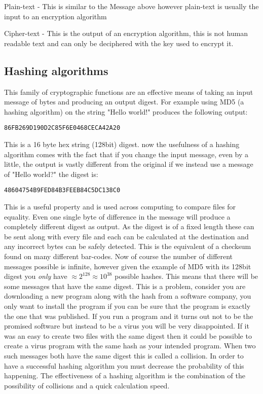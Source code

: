 \documentclass[12pt]{article}
\begin{document}
Plain-text - This is similar to the Message above however plain-text is usually the input to an encryption algorithm

Cipher-text - This is the output of an encryption algorithm, this is not human readable text and 
can only be deciphered with the key used to encrypt it.

\subsection{Hashing algorithms}
This family of cryptographic functions are an effective means of taking
an input message of bytes and producing an output digest. 
For example using MD5 (a hashing algorithm) on the string "Hello world!" produces the following output:

\begin{center}
{\tt 86FB269D190D2C85F6E0468CECA42A20}
\end{center}

This is a 16 byte hex string (128bit) digest. now the usefulness of a hashing algorithm
comes with the fact that if you change the input message, even by a little, the output is vastly different from the original if we instead use a message of "Hello world?" the digest is: 

\begin{center}
{\tt 48604754B9FED84B3FEEB84C5DC138C0}
\end{center}

This is a useful property and is used across computing to compare files for equality. Even one single byte of difference in the message will produce a completely different digest as output.
As the digest is of a fixed length these can be sent along with every file and each can be calculated at the destination and any incorrect bytes can be safely detected. This is the equivalent of a checksum found on many different bar-codes.
Now of course the number of different messages possible is infinite, however given
the example of MD5 with its 128bit digest you \textit{only} have  $\approx2^{128}\approx10^{38}$ possible hashes. This means that there will be some messages that have the
same digest. This is a problem, consider you are downloading a new program along
with the hash from a software company, you only want to install the program if
you can be sure that the program is exactly the one that was published. If you run a program and it turns out not to be the promised software but instead to be a virus you will be very disappointed. If it was an easy to create two files with the same digest then it could be possible to create a virus program with the same hash as your intended program.
When two such messages both have the same digest this is called a collision. In order to have a successful hashing algorithm you must decrease the probability of this happening. The effectiveness of a hashing algorithm is the combination of the possibility of collisions and a quick calculation speed.
\end{document}
